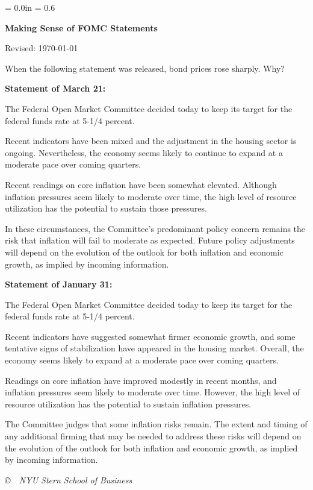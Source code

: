\documentclass[letterpaper,12pt]{article}
\def\HeadName{Making Sense of FOMC Statements}
\begin{document}
\parindent = 0.0in
\parskip = 0.6\bigskipamount
\thispagestyle{empty}%
\Head

\centerline{\large \bf \HeadName}%
\centerline{Revised:  \today}

\medskip 
When the following statement was released, bond prices rose sharply.  
Why?  

\medskip
{\bf Statement of March 21:} 

The Federal Open Market Committee decided today to keep its target for the federal funds rate at 5-1/4 percent.

Recent indicators have been mixed and the adjustment in the housing sector is ongoing. Nevertheless, the economy seems likely to continue to expand at a moderate pace over coming quarters.

Recent readings on core inflation have been somewhat elevated. Although inflation pressures seem likely to moderate over time, the high level of resource utilization has the potential to sustain those pressures.

In these circumstances, the Committee's predominant policy concern remains the risk that inflation will fail to moderate as expected. Future policy adjustments will depend on the evolution of the outlook for both inflation and economic growth, as implied by incoming information.


\medskip
{\bf Statement of January 31:} 

The Federal Open Market Committee decided today to keep its target for the federal funds rate at 5-1/4 percent.

Recent indicators have suggested somewhat firmer economic growth, and some tentative signs of stabilization have appeared in the housing market. Overall, the economy seems likely to expand at a moderate pace over coming quarters.

Readings on core inflation have improved modestly in recent months, and inflation pressures seem likely to moderate over time. However, the high level of resource utilization has the potential to sustain inflation pressures.

The Committee judges that some inflation risks remain. The extent and timing of any additional firming that may be needed to address these risks will depend on the evolution of the outlook for both inflation and economic growth, as implied by incoming information. 


\vfill \centerline{\it \copyright \ \number\year \ NYU Stern
School of Business}
\end{document}
